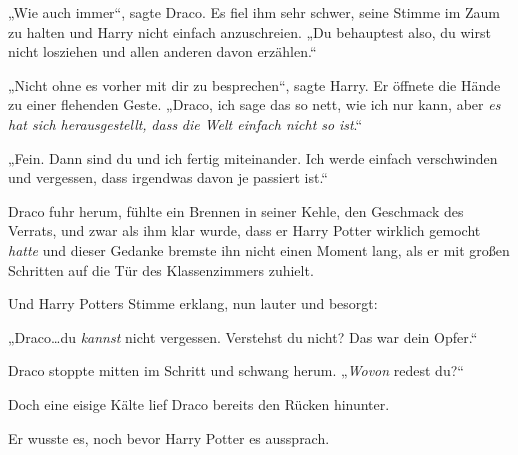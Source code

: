 „Wie auch immer“, sagte Draco. Es fiel ihm sehr schwer, seine Stimme im Zaum zu halten und Harry nicht einfach anzuschreien.
„Du behauptest also, du wirst nicht losziehen und allen anderen davon erzählen.“

„Nicht ohne es vorher mit dir zu besprechen“, sagte Harry. Er öffnete die Hände zu einer flehenden Geste.
„Draco, ich sage das so nett, wie ich nur kann, aber \emph{es hat sich herausgestellt,} \emph{dass} \emph{die Welt einfach nicht so} \emph{ist}.“

„Fein. Dann sind du und ich fertig miteinander. Ich werde einfach verschwinden und vergessen, dass irgendwas davon je passiert ist.“

Draco fuhr herum, fühlte ein Brennen in seiner Kehle, den Geschmack des Verrats, und zwar als ihm klar wurde, dass er Harry Potter wirklich gemocht \emph{hatte} und dieser Gedanke bremste ihn nicht einen Moment lang, als er mit großen Schritten auf die Tür des Klassenzimmers zuhielt.

Und Harry Potters Stimme erklang, nun lauter und besorgt:

„Draco…du \emph{kannst} nicht vergessen. Verstehst du nicht? Das war dein Opfer.“

Draco stoppte mitten im Schritt und schwang herum. „\emph{Wovon} redest du?“

Doch eine eisige Kälte lief Draco bereits den Rücken hinunter.

Er wusste es, noch bevor Harry Potter es aussprach.

